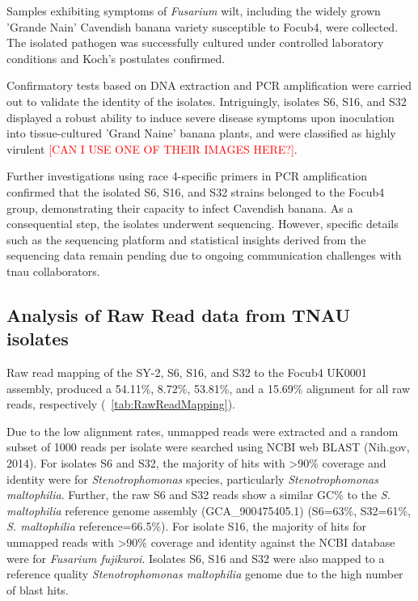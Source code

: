 Samples exhibiting symptoms of \textit{Fusarium} wilt, including the widely grown 'Grande Nain' Cavendish banana variety susceptible to \acs{Focub4}, were collected. The isolated pathogen was successfully cultured under controlled laboratory conditions and Koch's postulates confirmed. 

Confirmatory tests based on DNA extraction and PCR amplification were carried out to validate the identity of the isolates. Intriguingly,  isolates S6, S16, and S32 displayed a robust ability to induce severe disease symptoms upon inoculation into tissue-cultured 'Grand Naine' banana plants, and were classified as highly virulent \textcolor{red}{[CAN I USE ONE OF THEIR IMAGES HERE?]}.

Further investigations using race 4-specific primers in PCR amplification confirmed that the isolated S6, S16, and S32 strains belonged to the \acs{Focub4} group, demonstrating their capacity to infect Cavendish banana. As a consequential step, the isolates underwent sequencing. However, specific details such as the sequencing platform and statistical insights derived from the sequencing data remain pending due to ongoing communication challenges with \ac{tnau} collaborators.

\subsection{Analysis of Raw Read data from TNAU isolates}

Raw read mapping of the SY-2, S6, S16, and S32 to the \ac{Focub4} UK0001 assembly, produced a 54.11\%, 8.72\%, 53.81\%, and a 15.69\% alignment for all raw reads, respectively (~\ref{tab:RawReadMapping}). 

Due to the low alignment rates, unmapped reads were extracted and a random subset of 1000 reads per isolate were searched using NCBI web BLAST (Nih.gov, 2014). For isolates S6 and S32, the majority of hits with >90\% coverage and identity were for \textit{Stenotrophomonas} species, particularly \textit{Stenotrophomonas maltophilia}. Further, the raw S6 and S32 reads show a similar GC\% to the \textit{S. maltophilia }reference genome assembly (GCA\_900475405.1) (S6=63\%, S32=61\%, \textit{S. maltophilia} reference=66.5\%). For isolate S16, the majority of hits for unmapped reads with >90\% coverage and identity against the NCBI database were for \textit{Fusarium fujikuroi}. Isolates S6, S16 and S32 were also mapped to a reference quality \textit{Stenotrophomonas maltophilia} genome due to the high number of blast hits. 

